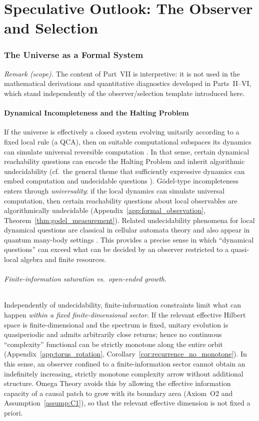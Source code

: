 \part{Speculative Outlook: The Observer and Selection}
\label{part:VII}

\section{The Universe as a Formal System}
\label{chap:formal_system}
\noindent\textit{Remark (scope).} The content of Part~VII is interpretive: it is not used in the mathematical derivations and quantitative diagnostics developed in Parts~II--VI, which stand independently of the observer/selection template introduced here.

\subsection{Dynamical Incompleteness and the Halting Problem}
If the universe is effectively a closed system evolving unitarily according to a fixed local rule (a QCA), then on suitable computational subspaces its dynamics can simulate universal reversible computation \cite{Watrous1995QCA,SchumacherWerner2004}. In that sense, certain dynamical reachability questions can encode the Halting Problem and inherit algorithmic undecidability (cf.\ the general theme that sufficiently expressive dynamics can embed computation and undecidable questions \cite{Moore1990Unpredictability}).
Gödel-type incompleteness enters through \emph{universality}: if the local dynamics can simulate universal computation, then certain reachability questions about local observables are algorithmically undecidable (Appendix~\ref{app:formal_observation}, Theorem~\ref{thm:godel_measurement}). Related undecidability phenomena for local dynamical questions are classical in cellular automata theory and also appear in quantum many-body settings \cite{Kari1994Reversibility,CubittPerezGarciaWolf2015SpectralGap}. This provides a precise sense in which ``dynamical questions'' can exceed what can be decided by an observer restricted to a quasi-local algebra and finite resources.

\paragraph{Finite-information saturation vs.\ open-ended growth.}
Independently of undecidability, finite-information constraints limit what can happen \emph{within a fixed finite-dimensional sector}. If the relevant effective Hilbert space is finite-dimensional and the spectrum is fixed, unitary evolution is quasiperiodic and admits arbitrarily close returns; hence no continuous ``complexity'' functional can be strictly monotone along the entire orbit (Appendix~\ref{app:torus_rotation}, Corollary~\ref{cor:recurrence_no_monotone}). In this sense, an observer confined to a finite-information sector cannot obtain an indefinitely increasing, strictly monotone complexity arrow without additional structure. Omega Theory avoids this by allowing the effective information capacity of a causal patch to grow with its boundary area (Axiom~O2 and Assumption~\ref{assump:C1}), so that the relevant effective dimension is not fixed a priori.

